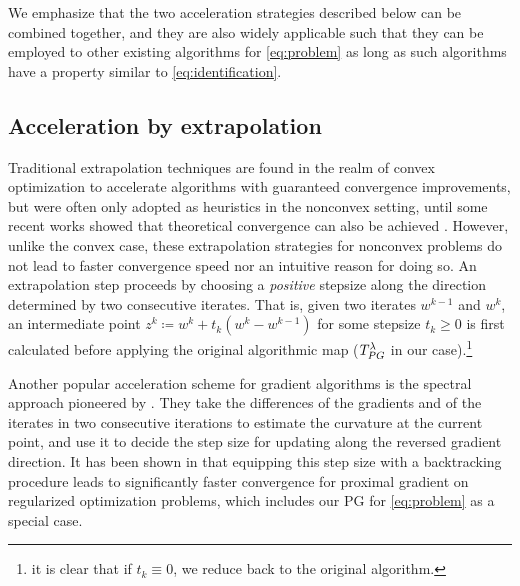 \documentclass{article}
\theoremstyle{plain}
\theoremstyle{definition}
\theoremstyle{remark}
\newcommand{\Tpg}{T_{\rm PG}^{\lambda}}
\begin{document}
We emphasize that the two acceleration strategies described below can
be combined together, and they are also widely applicable such that
they can be employed to other existing algorithms for
\cref{eq:problem} as long as such algorithms have a property similar to
\cref{eq:identification}.


\subsection{Acceleration by extrapolation}
Traditional extrapolation techniques are found in the realm of convex
optimization to accelerate algorithms 
\citep{BeckTeboulle09,Nesterov83} with guaranteed convergence
improvements, but were often only adopted as heuristics in the
nonconvex setting, until some recent works showed that theoretical
convergence can also be achieved \citep{NIPS2015_f7664060,WCP18}.
However, unlike the convex case, these
extrapolation strategies for nonconvex problems do not lead to faster
convergence speed nor an intuitive reason for doing so.
An extrapolation step proceeds by choosing a 
\emph{positive} stepsize along the 
direction determined by two consecutive iterates. That is, given two iterates 
$w^{k-1}$ and $w^k$, an 
intermediate point $z^k \coloneqq w^k + t_k (w^k-w^{k-1})$ for some stepsize 
$t_k \geq 0$ is first calculated 
before applying the original algorithmic map ($\Tpg$ in our
case).\footnote{it is clear that if $t_k \equiv 0$, we reduce back to
the original algorithm.}

Another popular acceleration scheme for gradient algorithms is the
spectral approach pioneered by \cite{JB88a}.
They take the differences of the gradients and of the iterates in two
consecutive iterations to estimate the curvature at the
current point, and use it to decide the step size for updating along
the reversed gradient direction.
It has been shown in \cite{WriNF09a} that equipping this step size
with a backtracking procedure leads to significantly faster
convergence for proximal gradient on regularized optimization
problems, which includes our PG for \cref{eq:problem} as a special case.
\end{document}
